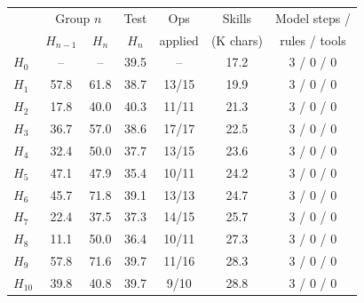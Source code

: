 \begin{tabular}{@{}lcccccc@{}}
\toprule
& \multicolumn{2}{c}{Group $n$} & Test & Ops & Skills & Model steps / \\
& $H_{n-1}$ & $H_n$ & $H_n$ & applied & (K chars) & rules / tools \\
\midrule
$H_0$ & -- & -- & 39.5 & -- & 17.2 & 3 / 0 / 0 \\
$H_{1}$ & 57.8 & 61.8 & 38.7 & 13/15 & 19.9 & 3 / 0 / 0 \\
$H_{2}$ & 17.8 & 40.0 & 40.3 & 11/11 & 21.3 & 3 / 0 / 0 \\
$H_{3}$ & 36.7 & 57.0 & 38.6 & 17/17 & 22.5 & 3 / 0 / 0 \\
$H_{4}$ & 32.4 & 50.0 & 37.7 & 13/15 & 23.6 & 3 / 0 / 0 \\
$H_{5}$ & 47.1 & 47.9 & 35.4 & 10/11 & 24.2 & 3 / 0 / 0 \\
$H_{6}$ & 45.7 & 71.8 & 39.1 & 13/13 & 24.7 & 3 / 0 / 0 \\
$H_{7}$ & 22.4 & 37.5 & 37.3 & 14/15 & 25.7 & 3 / 0 / 0 \\
$H_{8}$ & 11.1 & 50.0 & 36.4 & 10/11 & 27.3 & 3 / 0 / 0 \\
$H_{9}$ & 57.8 & 71.6 & 39.7 & 11/16 & 28.3 & 3 / 0 / 0 \\
$H_{10}$ & 39.8 & 40.8 & 39.7 & 9/10 & 28.8 & 3 / 0 / 0 \\
\bottomrule
\end{tabular}
